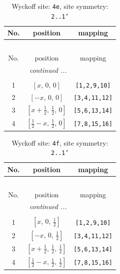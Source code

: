 \documentclass[fleqn,8pt]{jsarticle}
\begin{document}
\begin{longtable}{ccc}
\caption{Wyckoff site: {\tt 4e}, site symmetry: {\tt 2..1'}}
 \\
 \hline \hline
No. & position & mapping \\ \hline \endfirsthead

\multicolumn{2}{l}{\tablename\ \thetable{}} \\
 \hline \hline
No. & position & mapping \\ \hline \endhead

 \hline \hline
\multicolumn{2}{r}{\footnotesize\it continued ...} \\ \endfoot

 \hline \hline
\multicolumn{2}{r}{} \\ \endlastfoot

1 & $\left[ x,\, 0,\, 0 \right]$ & {\tt [1,2,9,10]} \\ \hline
2 & $\left[ - x,\, 0,\, 0 \right]$ & {\tt [3,4,11,12]} \\ \hline
3 & $\left[ x + \frac{1}{2},\, \frac{1}{2},\, 0 \right]$ & {\tt [5,6,13,14]} \\ \hline
4 & $\left[ \frac{1}{2} - x,\, \frac{1}{2},\, 0 \right]$ & {\tt [7,8,15,16]} \\
\end{longtable}
\renewcommand{\arraystretch}{1.2}
\begin{longtable}{ccc}
\caption{Wyckoff site: {\tt 4f}, site symmetry: {\tt 2..1'}}
 \\
 \hline \hline
No. & position & mapping \\ \hline \endfirsthead

\multicolumn{2}{l}{\tablename\ \thetable{}} \\
 \hline \hline
No. & position & mapping \\ \hline \endhead

 \hline \hline
\multicolumn{2}{r}{\footnotesize\it continued ...} \\ \endfoot

 \hline \hline
\multicolumn{2}{r}{} \\ \endlastfoot

1 & $\left[ x,\, 0,\, \frac{1}{2} \right]$ & {\tt [1,2,9,10]} \\ \hline
2 & $\left[ - x,\, 0,\, \frac{1}{2} \right]$ & {\tt [3,4,11,12]} \\ \hline
3 & $\left[ x + \frac{1}{2},\, \frac{1}{2},\, \frac{1}{2} \right]$ & {\tt [5,6,13,14]} \\ \hline
4 & $\left[ \frac{1}{2} - x,\, \frac{1}{2},\, \frac{1}{2} \right]$ & {\tt [7,8,15,16]} \\
\end{longtable}
\end{document}
